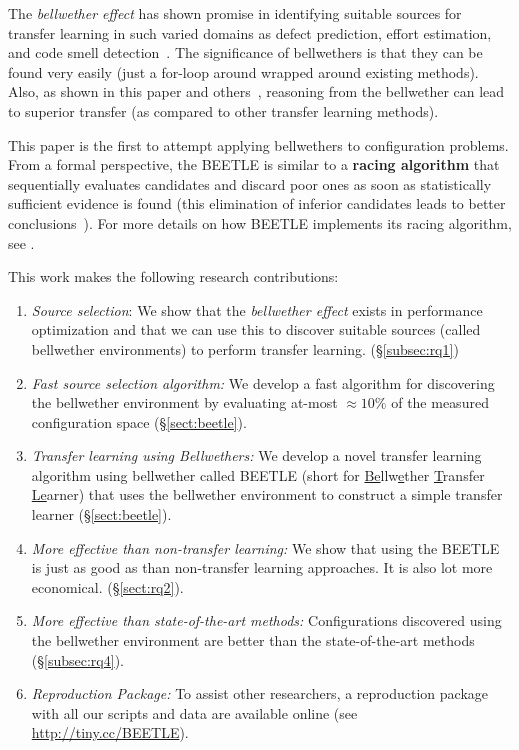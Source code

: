 \documentclass[10pt,journal,compsoc]{IEEEtran}
\begin{document}
The \textit{bellwether effect} has shown promise in identifying suitable 
sources for transfer learning in such varied domains as defect prediction, 
effort estimation, and code smell detection~\cite{krishna18}.
The significance of bellwethers is that they can be found very easily
(just a for-loop around wrapped around existing methods). Also, as shown in this paper and
others~\cite{krishna16,mensah17a,mensah17b, krishna18}, reasoning from the bellwether can lead to superior transfer (as compared to other transfer learning methods).

This paper is the first to attempt applying bellwethers to configuration problems. 
From a formal perspective, the BEETLE is similar to a  {\bf racing algorithm}
that sequentially evaluates candidates and discard poor ones as soon as statistically sufficient evidence is found (this elimination of inferior candidates leads to better conclusions~\cite{birattari2002racing}).
For more details on how BEETLE implements its racing algorithm, see .

This work  makes the  following research contributions: 
\begin{enumerate}[leftmargin=*]
\item \textit{Source selection}: We show that the \textit{bellwether effect} exists in performance optimization and that we can use this to discover suitable sources (called bellwether environments) to perform transfer learning. (\S\ref{subsec:rq1})
\item \textit{Fast source selection algorithm:} We develop a fast algorithm for discovering the bellwether environment by evaluating at-most $\approx10\%$ of the measured configuration space (\S\ref{sect:beetle}).
\item \textit{Transfer learning using Bellwethers:} We develop a novel transfer 
learning algorithm using bellwether called BEETLE (short for  
\underline{Be}llw\underline{e}ther \underline{T}ransfer \underline{Le}arner)
that uses the bellwether environment to construct a simple transfer learner 
(\S\ref{sect:beetle}).
\item \textit{More effective than non-transfer learning: } We show that using the BEETLE is just as good as than non-transfer learning approaches. It is also lot more economical. (\S\ref{sect:rq2}).
\item \textit{More effective than state-of-the-art methods: } Configurations discovered using the bellwether environment are better than the state-of-the-art 
methods~\cite{valov2017transferring, jamshidi2017transfer} (\S\ref{subsec:rq4}).

\item \textit{Reproduction Package: } To assist other researchers, a reproduction package with all our scripts and data are available online (see \url{http://tiny.cc/BEETLE}).
\end{enumerate}
\end{document}
